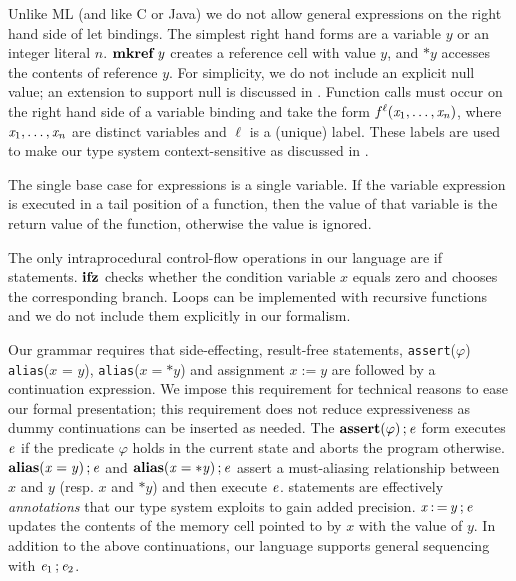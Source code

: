 Unlike ML (and like C or Java) we do not allow general expressions on the right hand side of
let bindings. The simplest right hand forms are a variable $\mathit{y}$ or an integer literal $n$.
$ \operatorname{\mathbf{mkref}}  \mathit{y} $ creates a reference cell with value $\mathit{y}$, and
$ *  \mathit{y} $ accesses the contents of reference $\mathit{y}$. For simplicity,
we do not include an explicit null value;
an extension to support null is discussed in .
Function calls must occur on the right hand side of a variable binding
and take the form $ \mathit{f} ^ \ell (  \mathit{x_{{\mathrm{1}}}} ,\ldots, \mathit{x_{\mathit{n}}}  ) $, where $ \mathit{x_{{\mathrm{1}}}} ,\ldots, \mathit{x_{\mathit{n}}} $ are distinct variables and $\ell$ is a
(unique) label. %
These labels are used to make our type system context-sensitive as
discussed in .

The single base case for expressions is a single variable.
If the variable expression is executed in a tail position of a function,
then the value of that variable is the return value of the function,
otherwise the value is ignored.

The only intraprocedural control-flow operations in our language are if statements.
$\mathbf{ifz}$ checks whether the condition variable $\mathit{x}$ equals zero and chooses
the corresponding branch. Loops can be implemented with recursive functions and
we do not include them explicitly in our formalism.

Our grammar requires that side-effecting, result-free statements, \lstinline{assert}($\varphi$)
\lstinline{alias}($\mathit{x}$ = $\mathit{y}$), \lstinline{alias}($\mathit{x} = *\mathit{y}$) and
assignment $\mathit{x} := \mathit{y}$ are followed by a continuation expression.
We impose this requirement for technical reasons to ease our formal
presentation; this requirement does not reduce expressiveness
as dummy continuations can be inserted as needed.
The $ \mathbf{assert}( \varphi ) \operatorname{;}  \mathit{e} $ form executes $\mathit{e}$ if the predicate
$\varphi$ holds in the current state and aborts the program otherwise.
$ \mathbf{alias}( \mathit{x}  =  \mathit{y} ) \operatorname{;}  \mathit{e} $ and $ \mathbf{alias}( \mathit{x}  = *  \mathit{y} ) \operatorname{;}  \mathit{e} $ assert a must-aliasing relationship between $x$ and $y$ (resp. $\mathit{x}$ and $ *  \mathit{y} $)
and then execute $\mathit{e}$.
 statements
are effectively \emph{annotations} that our type system exploits to gain
added precision.
$ \mathit{x}  \operatorname{:=}  \mathit{y}  \operatorname{;}  \mathit{e} $ updates the contents of the memory cell pointed to by $\mathit{x}$
with the value of $\mathit{y}$.
In addition to the above continuations, our language supports general sequencing with
$ \mathit{e_{{\mathrm{1}}}}  \operatorname{;}  \mathit{e_{{\mathrm{2}}}} $.

